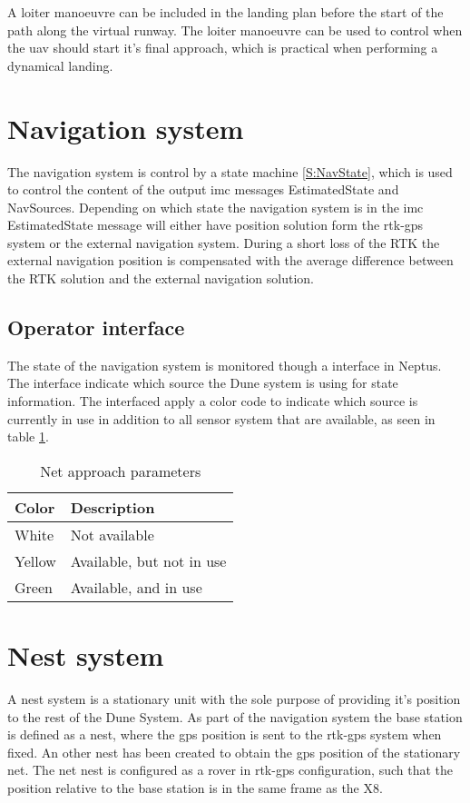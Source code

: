 A loiter manoeuvre can be included in the landing plan before the start of the path along the virtual runway. The loiter manoeuvre can be used to control when the \gls{uav} should start it's final approach, which is practical when performing a dynamical landing.
\section{Navigation system}
The navigation system is control by a state machine \ref{S:NavState}, which is used to control the content of the output \gls{imc} messages EstimatedState and NavSources. Depending on which state the navigation system is in the \gls{imc} EstimatedState message will either have position solution form the \gls{rtk-gps} system or the external navigation system. During a short loss of the RTK the external navigation position is compensated with the average difference between the RTK solution and the external navigation solution.
\subsection{Operator interface}
The state of the navigation system is monitored though a interface in Neptus. The interface indicate which source the Dune system is using for state information. The interfaced apply a color code to indicate which source is currently in use in addition to all sensor system that are available, as seen in table \ref{Tb:Color Code}.
\begin{table}[H]
\begin{center}
    \begin{tabular}{ | l | l |}
    \hline
    \textbf{Color} & \textbf{Description} \\ \hline
    White & Not available \\ \hline
    Yellow & Available, but not in use \\ \hline
    Green & Available, and in use \\ \hline
    \end{tabular}
\end{center}
\caption{Net approach parameters }
\label{Tb:Color Code}
\end{table}
\section{Nest system}
A nest system is a stationary unit with the sole purpose of providing it's position to the rest of the Dune System. As part of the navigation system the base station is defined as a nest, where the \gls{gps} position is sent to the \gls{rtk-gps} system when fixed.
An other nest has been created to obtain the \gls{gps} position of the stationary net. The net nest is configured as a rover in \gls{rtk-gps} configuration, such that the position relative to the base station is in the same frame as the X8.
